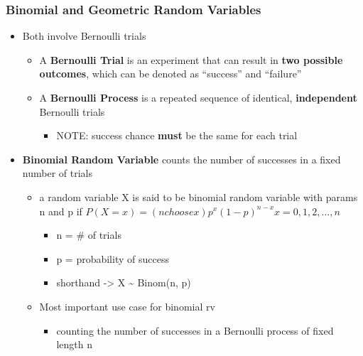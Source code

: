 \documentclass[
]{article}
\providecommand{\tightlist}{%
  \setlength{\itemsep}{0pt}\setlength{\parskip}{0pt}}
\begin{document}
\hypertarget{binomial-and-geometric-random-variables}{%
\subsubsection{Binomial and Geometric Random
Variables}\label{binomial-and-geometric-random-variables}}

\begin{itemize}
\tightlist
\item
  Both involve Bernoulli trials

  \begin{itemize}
  \tightlist
  \item
    A \textbf{Bernoulli Trial} is an experiment that can result in
    \textbf{two possible outcomes}, which can be denoted as ``success''
    and ``failure''
  \item
    A \textbf{Bernoulli Process} is a repeated sequence of identical,
    \textbf{independent} Bernoulli trials

    \begin{itemize}
    \tightlist
    \item
      NOTE: success chance \textbf{must} be the same for each trial
    \end{itemize}
  \end{itemize}
\item
  \textbf{Binomial Random Variable} counts the number of successes in a
  fixed number of trials

  \begin{itemize}
  \tightlist
  \item
    a random variable X is said to be binomial random variable with
    params n and p if
    \(P(X = x) = (n choose x)p^{x}(1-p)^{n-x} x = 0, 1, 2, ..., n\)

    \begin{itemize}
    \tightlist
    \item
      n = \# of trials
    \item
      p = probability of success
    \item
      shorthand -\textgreater{} X \textasciitilde{} Binom(n, p)
    \end{itemize}
  \item
    Most important use case for binomial rv

    \begin{itemize}
    \tightlist
    \item
      counting the number of successes in a Bernoulli process of fixed
      length n


\end{itemize}
\end{itemize}
\end{itemize}
\end{document}
